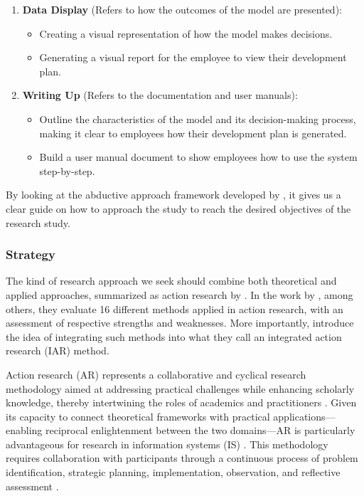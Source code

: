 \begin{enumerate}[label=\arabic*.]
    \item \textbf{Data Display} (Refers to how the outcomes of the model are presented):
    \begin{itemize}
        \item Creating a visual representation of how the model makes decisions.
        \item Generating a visual report for the employee to view their development plan.
    \end{itemize}

    \item \textbf{Writing Up} (Refers to the documentation and user manuals):
    \begin{itemize}
        \item Outline the characteristics of the model and its decision-making process, making it clear to employees how their development plan is generated.
        \item Build a user manual document to show employees how to use the system step-by-step.
    \end{itemize}
\end{enumerate}

By looking at the abductive approach framework developed by \cite{thompson2022guide}, it gives us a clear guide on how to approach the study to reach the desired objectives of the research study.

\subsubsection{Strategy}

The kind of research approach we seek should combine both theoretical and applied approaches, summarized as action research by \cite{avison1999action}. In the work by \cite{davison2021research}, among others, they evaluate 16 different methods applied in action research, with an assessment of respective strengths and weaknesses. More importantly, \cite{davison2021research} introduce the idea of integrating such methods into what they call an integrated action research (IAR) method.

Action research (AR) represents a collaborative and cyclical research methodology aimed at addressing practical challenges while enhancing scholarly knowledge, thereby intertwining the roles of academics and practitioners \cite{davison2021research}. Given its capacity to connect theoretical frameworks with practical applications—enabling reciprocal enlightenment between the two domains—AR is particularly advantageous for research in information systems (IS) \cite{avison1999action}. This methodology requires collaboration with participants through a continuous process of problem identification, strategic planning, implementation, observation, and reflective assessment \cite{lewin1946action}.

